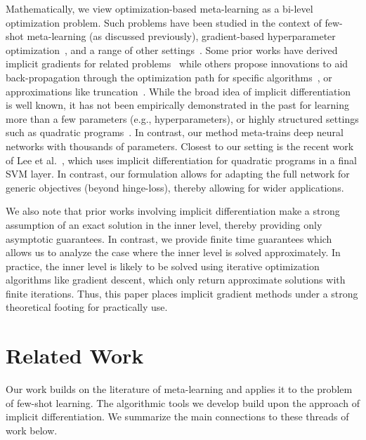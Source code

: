 \documentclass{article} \usepackage[nonatbib, final]{mod_neurips}
\begin{document}
Mathematically, we view optimization-based meta-learning as a bi-level optimization problem. Such problems have been studied in the context of few-shot meta-learning (as discussed previously), gradient-based hyperparameter optimization~\cite{maclaurin2015gradient, pedregosa2016hyperparameter, franceschi2017forward, domke2012, Do2007EfficientMH}, and a range of other settings~\cite{amos2017optnet,landry2019differentiable}. Some prior works have derived implicit gradients for related problems~\cite{pedregosa2016hyperparameter, domke2012, amos2017optnet} while others propose innovations to aid back-propagation through the optimization path for specific algorithms~\cite{maclaurin2015gradient, franceschi2017forward,Hascot2006EnablingUC}, or approximations like truncation~\cite{Shaban2018TruncatedBF}. While the broad idea of implicit differentiation is well known, it has not been empirically demonstrated in the past for learning more than a few parameters (e.g., hyperparameters), or highly structured settings such as quadratic programs~\cite{amos2017optnet}. In contrast, our method meta-trains deep neural networks with thousands of parameters.
Closest to our setting is the recent work of Lee et al.~\cite{lee2019meta}, which uses implicit differentiation for quadratic programs in a final SVM layer. In contrast, our formulation allows for adapting the full network for generic objectives (beyond hinge-loss), thereby allowing for wider applications. 

We also note that prior works involving implicit differentiation make a strong assumption of an exact solution in the inner level, thereby providing only asymptotic guarantees. In contrast, we provide finite time guarantees which allows us to analyze the case where the inner level is solved approximately. In practice, the inner level is likely to be solved using iterative optimization algorithms like gradient descent, which only return approximate solutions with finite iterations. Thus, this paper places implicit gradient methods under a strong theoretical footing for practically use.






\iffalse
\section{Related Work}
Our work builds on the literature of meta-learning and applies it to the problem of few-shot learning. The algorithmic tools we develop build upon the approach of implicit differentiation. We summarize the main connections to these threads of work below.
\end{document}
